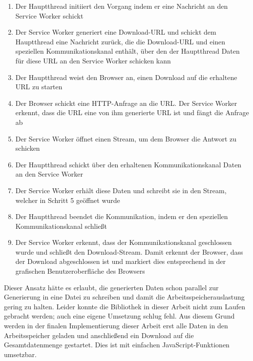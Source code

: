 \begin{enumerate}
    \item Der Hauptthread initiiert den Vorgang indem er eine Nachricht an den Service Worker schickt
    \item Der Service Worker generiert eine Download-URL und schickt dem Hauptthread eine Nachricht zurück, die die Download-URL und einen speziellen Kommunikationskanal enthält, über den der Hauptthread Daten für diese URL an den Service Worker schicken kann
    \item Der Hauptthread weist den Browser an, einen Download auf die erhaltene URL zu starten
    \item Der Browser schickt eine HTTP-Anfrage an die URL. Der Service Worker erkennt, dass die URL eine von ihm generierte URL ist und fängt die Anfrage ab
    \item Der Service Worker öffnet einen Stream, um dem Browser die Antwort zu schicken
    \item Der Hauptthread schickt über den erhaltenen Kommunikationskanal Daten an den Service Worker
    \item Der Service Worker erhält diese Daten und schreibt sie in den Stream, welcher in Schritt 5 geöffnet wurde
    \item Der Hauptthread beendet die Kommunikation, indem er den speziellen Kommunikationskanal schließt
    \item Der Service Worker erkennt, dass der Kommunikationskanal geschlossen wurde und schließt den Download-Stream. Damit erkennt der Browser, dass der Download abgeschlossen ist und markiert dies entsprechend in der grafischen Benutzeroberfläche des Browsers
\end{enumerate}

Dieser Ansatz hätte es erlaubt, die generierten Daten schon parallel zur Generierung in eine Datei zu schreiben und damit die Arbeitsspeicherauslastung gering zu halten. Leider konnte die Bibliothek in dieser Arbeit nicht zum Laufen gebracht werden; auch eine eigene Umsetzung schlug fehl. Aus diesem Grund werden in der finalen Implementierung dieser Arbeit erst alle Daten in den Arbeitsspeicher geladen und anschließend ein Download auf die Gesamtdatenmenge gestartet. Dies ist mit einfachen JavaScript-Funktionen umsetzbar.